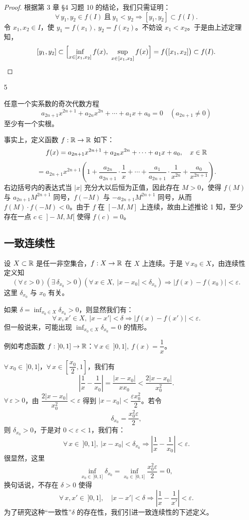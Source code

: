 \begin{proof}

	根据第 3 章 \S4 习题 10 的结论，我们只需证明：
	\[
	\forall\,y_1,y_2\in f(I)\ \text{且}\ y_1<y_2\Longrightarrow[y_1,y_2]\subset f(I).
	\]
	令 \(x_1,x_2\in I\)，使 \(y_1=f(x_1),\ y_2=f(x_2)\)。不妨设 \(x_1<x_2\)。于是由上述定理知，
	\[
	[y_1,y_2]\subset\Bigl[\inf_{x\in[x_1,x_2]}f(x),\ \sup_{x\in[x_1,x_2]}f(x)\Bigr]=f\bigl([x_1,x_2]\bigr)\subset f(I).
	\]

\end{proof}

\begin{sourceexample}{5}

	任意一个实系数的奇次代数方程
	\[
	a_{2n+1}x^{2n+1}+a_{2n}x^{2n}+\cdots+a_1x+a_0=0\quad(a_{2n+1}\neq0)
	\]
	至少有一个实根。

	事实上，定义函数 \(f:\mathbb{R}\to\mathbb{R}\) 如下：
	\[
	f(x)=a_{2n+1}x^{2n+1}+a_{2n}x^{2n}+\cdots+a_1x+a_0,\quad x\in\mathbb{R}
	\]
	\[
	=a_{2n+1}x^{2n+1}\left(1+\frac{a_{2n}}{a_{2n+1}}\cdot\frac1x+\cdots+\frac{a_1}{a_{2n+1}}\cdot\frac1{x^{2n}}+\frac{a_0}{x^{2n+1}}\right).
	\]
	右边括号内的表达式当 \(|x|\) 充分大以后恒为正值，因此存在 \(M>0\)，使得 \(f(M)\) 与 \(a_{2n+1}M^{2n+1}\) 同号，\(f(-M)\) 与 \(-a_{2n+1}M^{2n+1}\) 同号，从而 \(f(M)\cdot f(-M)<0\)。由于 \(f\) 在 \([-M,M]\) 上连续，故由上述推论 1 知，至少存在一点 \(c\in\ ]-M,M[\) 使得 \(f(c)=0\)。

\end{sourceexample}

\subsection{一致连续性}

设 \(X\subset\mathbb{R}\) 是任一非空集合，\(f:X\to\mathbb{R}\) 在 \(X\) 上连续。于是 \(\forall\,x_0\in X\)，由连续性定义知
\[
(\forall\,\varepsilon>0)(\exists\,\delta_{x_0}>0)(\forall\,x\in X,\ |x-x_0|<\delta_{x_0})\Longrightarrow|f(x)-f(x_0)|<\varepsilon.
\]
这里 \(\delta_{x_0}\) 与 \(x_0\) 有关。

如果 \(\delta=\inf_{x_0\in X}\delta_{x_0}>0\)，则显然我们有：
\[
\forall\,x,x'\in X,\ |x-x'|<\delta\Longrightarrow|f(x)-f(x')|<\varepsilon.
\]
但一般说来，可能出现 \(\inf_{x_0\in X}\delta_{x_0}=0\) 的情形。

例如考虑函数 \(f:\ ]0,1]\to\R\)：\(\forall\,x\in\ ]0,1],\ f(x)=\dfrac1x\)。

\(\forall\,x_0\in\ ]0,1]\)，\(\forall\,x\in\left[\dfrac{x_0}{2},1\right]\)，我们有
\[
\left|\frac1x-\frac1{x_0}\right|=\frac{|x-x_0|}{xx_0}<\frac{2|x-x_0|}{x_0^2}.
\]
\(\forall\,\varepsilon>0\)，由 \(\dfrac{2|x-x_0|}{x_0^2}<\varepsilon\) 得到 \(|x-x_0|<\dfrac{\varepsilon x_0^2}{2}\)。若令
\[
\delta_{x_0}=\frac{x_0^2\varepsilon}{2},
\]
则 \(\delta_{x_0}>0\)，于是对 \(0<\varepsilon<1\)，我们有：
\[
\forall\,x\in\ ]0,1],\ |x-x_0|<\delta_{x_0}\Longrightarrow\left|\frac1x-\frac1{x_0}\right|<\varepsilon.
\]
很显然，这里
\[
\inf_{x_0\in\ ]0,1]}\delta_{x_0}=\inf_{x_0\in\ ]0,1]}\frac{x_0^2\varepsilon}{2}=0,
\]
换句话说，不存在 \(\delta>0\) 使得
\[
\forall\,x,x'\in\ ]0,1],\quad |x-x'|<\delta\Longrightarrow\left|\frac1x-\frac1{x'}\right|<\varepsilon.
\]
为了研究这种“一致性”\(\delta\) 的存在性，我们引进一致连续性的下述定义。

